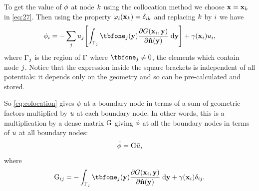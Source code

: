 To get the value of $\phi$ at node ${k}$ using the collocation method we choose $\boldsymbol{\mathrm{x}} = \boldsymbol{\mathrm{x}}_{k}$ in \cref{eq:27}.
Then using the property $\varphi_{i}(\boldsymbol{\mathrm{x}}_{k}) = \delta_{{i} {k}}$ and replacing ${k}$ by ${i}$ we have
\begin{equation}
  \phim_{\ibasis} =
  - \sum_\ibasisb \phione_{\ibasisb}  \bigs{\int_{\boundd_\ibasisb} \tbfone_{\ibasisb}(\yv)
  \pd{\Green[\ibasis]}{\nv(\yv)} \d \yv}
   + \gamma(\xv_\ibasis) \phione_{\ibasis},
  \label{eq:colocation}
\end{equation}
where ${{\Gamma}_{j}}$ is the region of ${\Gamma}$ where $\tbfone_{\ibasisb} \neq 0$, \ie the elements which contain node ${j}$.
Notice that the expression inside the square brackets is independent of all potentials: it depends only on the geometry and so can be pre-calculated and stored.


So \cref{eq:colocation} gives $\phi$ at a boundary node in terms of a sum of geometric factors multiplied by $u$ at each boundary node.
In other words, this is a multiplication by a dense matrix ${\mathbf{\mathrm{G}}}$ giving $\phi$ at all the boundary nodes in terms of $u$ at all boundary nodes:
\begin{equation}
  \label{eq:10}
  \tilde{\phi} = {\mathbf{\mathrm{G}}} \tilde{u},
\end{equation}
where
\begin{equation}
  \label{eq:17}
  \bm_{\ibasis\ibasisb} = - \int_{\boundd_\ibasisb} \tbfone_{\ibasisb}(\yv) \pd{\Green[\ibasis]}{\nv(\yv)} \d \yv
   + \gamma(\xv_\ibasis)\delta_{\ibasis\ibasisb}.
\end{equation}



